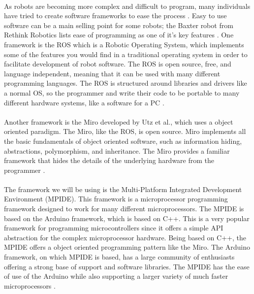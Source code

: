\documentclass[titlepage,letterpaper,12pt]{article}
\begin{document}
\paragraph{}As robots are becoming more complex and difficult to program, many
individuals have tried to create software frameworks to ease the process
\cite{quigley2009ros}. Easy to use software can be a main selling point for some
robots; the Baxter robot from Rethink Robotics lists ease of programming as one
of it's key features \cite{baxterdata}. One framework is the ROS which is a
Robotic Operating System, which implements some of the features you would find
in a traditional operating system in order to facilitate development of robot
software. The ROS is open source, free, and language independent, meaning that
it can be used with many different programming languages. The ROS is structured
around libraries and drivers like a normal OS, so the programmer and write their
code to be portable to many different hardware systems, like a software for a PC
\cite{quigley2009ros}.

\paragraph{}Another framework is the Miro developed by Utz et al., which
uses a object oriented paradigm. The Miro, like the ROS, is
open source. Miro implements all the basic fundamentals of object oriented
software, such as information hiding, abstractions, polymorphism, and
inheritance. The Miro provides a familiar framework that hides the details of
the underlying hardware from the programmer \cite{utz2002miro}.

\paragraph{}The framework we will be using is the Multi-Platform Integrated
Development Environment (MPIDE). This framework is a microprocessor programming
framework designed to work for many different microprocessors. The MPIDE is
based on the Arduino framework, which is based on C++. This is a very popular
framework for programming microcontrollers since it offers a simple API
abstraction for the complex microprocessor hardware. Being based on C++, the
MPIDE offers a object oriented programming pattern like the Miro. The Arduino
framework, on which MPIDE is based, has a large community of enthusiasts
offering a strong base of support and software libraries. The MPIDE has the ease
of use of the Arduino while also supporting a larger variety of much faster
microprocessors \cite{anderson2013using}.
\end{document}
